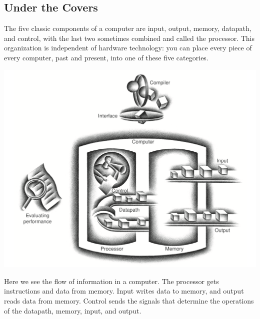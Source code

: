 \documentclass[10pt]{article}
\begin{document}
\subsection{Under the Covers}\label{subsec:}
The five classic components of a computer are input, output, memory, datapath, and control, with the last two sometimes combined and called the processor. This organization is independent of hardware technology: you can place every piece of every computer, past and present, into one of these five categories.
\begin{marginfigure}
  \begin{center}
    \includegraphics[width=\linewidth]{4.png}
  \end{center}
  \caption{Here we see the flow of information in a computer.  The processor gets instructions and data from memory. Input writes data to memory, and output reads data from memory.  Control sends the signals that determine the operations of the datapath, memory, input, and output.}
\end{marginfigure}%
\end{document}
